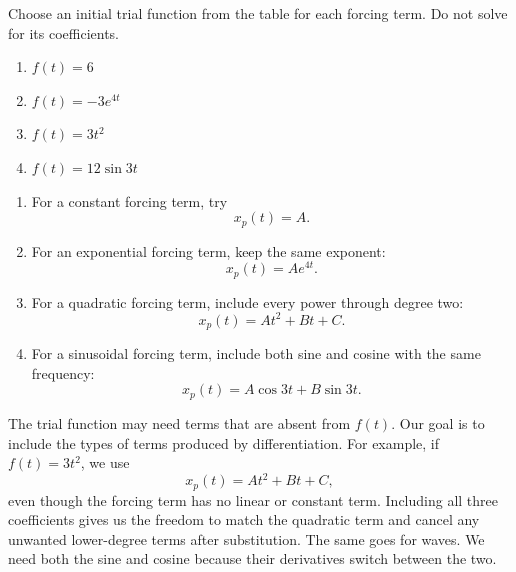 \documentclass[10pt,letterpaper]{article}
\begin{document}
\begin{example}{
Choose an initial trial function from the table for each forcing term.
Do not solve for its coefficients.
\begin{enumerate}
    \item $f(t)=6$
    \item $f(t)=-3e^{4t}$
    \item $f(t)=3t^2$
    \item $f(t)=12\sin 3t$
\end{enumerate}
}
\begin{enumerate}
    \item For a constant forcing term, try
    \[
    x_p(t)=A.
    \]

    \item For an exponential forcing term, keep the
    same exponent:
    \[
    x_p(t)=Ae^{4t}.
    \]

    \item For a quadratic forcing term, include every
    power through degree two:
    \[
    x_p(t)=At^2+Bt+C.
    \]

    \item For a sinusoidal forcing term, include both
    sine and cosine with the same frequency:
    \[
    x_p(t)=A\cos 3t+B\sin 3t.
    \]
\end{enumerate}
\end{example}

The trial function may need terms that are absent from $f(t)$.
Our goal is to include the types of terms produced by
differentiation. For example, if $f(t)=3t^2$, we use
\[
x_p(t)=At^2+Bt+C,
\]
even though the forcing term has no linear or constant term.
Including all three coefficients gives us the freedom to
match the quadratic term and cancel any unwanted lower-degree
terms after substitution. The same goes for waves. We need both 
the sine and cosine because their derivatives switch between the two. 


\end{document}
